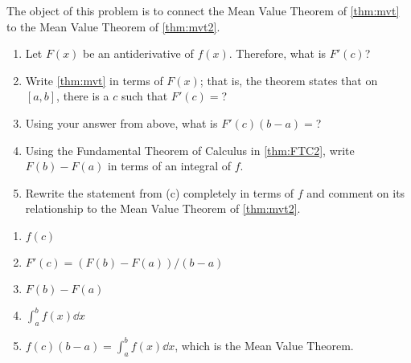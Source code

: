 {The object of this problem is to connect the Mean Value Theorem of \autoref{thm:mvt} to the Mean Value Theorem of \autoref{thm:mvt2}.
\begin{enumerate}
\item		Let $F(x)$ be an antiderivative of $f(x)$. Therefore, what is $F'(c)$?
\item		Write \autoref{thm:mvt} in terms of $F(x)$; that is, the theorem states that on $[a,b]$, there is a $c$ such that $F'(c) = $?
\item		Using your answer from above, what is $F'(c)(b-a)=$?
\item		Using the Fundamental Theorem of Calculus in \autoref{thm:FTC2}, write $F(b) -F(a)$ in terms of an integral of $f$.
\item		Rewrite the statement from (c) completely in terms of $f$ and comment on its relationship to the Mean Value Theorem of \autoref{thm:mvt2}.
\end{enumerate}
}
{\begin{enumerate}
\item		$f(c)$
\item		$F'(c) = (F(b)-F(a))/(b-a)$
\item		$F(b) - F(a)$
\item		$\int_a^b f(x) \dd x$
\item		$f(c)(b-a) = \int_a^b f(x)\dd x$, which is the Mean Value Theorem.
\end{enumerate}
}


